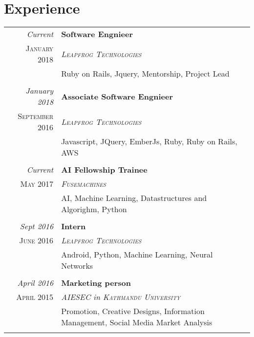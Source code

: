 \documentclass[a4paper,10pt]{article}
\begin{document}
\section{Experience}
\begin{tabular}{r|p{11cm}}
\emph{Current} & \textbf{Software Engnieer}\\ \textsc{January 2018} & \emph{\textsc{Leapfrog Technologies}} \\&\footnotesize{Ruby on Rails, Jquery, Mentorship, Project Lead}\\\multicolumn{2}{c}{} \\
\emph{January 2018} & \textbf{Associate Software Engnieer}\\ \textsc{September 2016} & \emph{\textsc{Leapfrog Technologies}} \\&\footnotesize{Javascript, JQuery, EmberJs, Ruby, Ruby on Rails, AWS}\\\multicolumn{2}{c}{} \\
 \emph{Current} & \textbf{AI Fellowship Trainee}\\ \textsc{May 2017} & \emph{\textsc{Fusemachines}} \\&\footnotesize{AI, Machine Learning, Datastructures and Algorighm, Python}\\\multicolumn{2}{c}{} \\
 \emph{Sept 2016} & \textbf{Intern}\\ \textsc{June 2016} & \emph{\textsc{Leapfrog Technologies}} \\&\footnotesize{Android, Python, Machine Learning, Neural Networks}\\\multicolumn{2}{c}{} \\
 \emph{April 2016} & \textbf{Marketing person}\\ \textsc{April 2015} & \emph{\textsc{AIESEC} in \textsc{Kathmandu University}} \\&\footnotesize{Promotion, Creative Designs, Information Management, Social Media Market Analysis}\\\multicolumn{2}{c}{} \\
\end{tabular}
\end{document}
